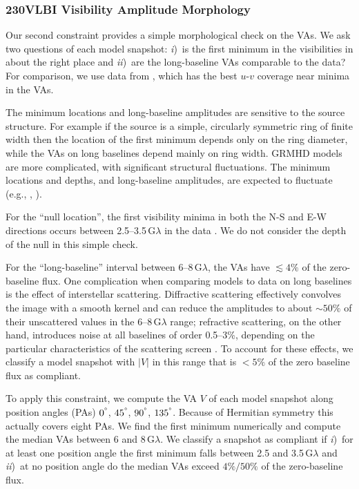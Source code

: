 \subsubsection{230\GHz VLBI Visibility Amplitude Morphology}

Our second constraint provides a simple morphological check on the
VAs.
We ask two questions of each model snapshot: \emph{i})~is the first
minimum in the visibilities in about the right place and
\emph{ii})~are the long-baseline VAs comparable to the data?
For comparison, we use data from \aprilvii, which has the best $u$-$v$
coverage near minima in the VAs.

The minimum locations and long-baseline amplitudes are sensitive to the
source structure.
For example if the source is a simple, circularly symmetric ring of
finite width then the location of the first minimum depends only on
the ring diameter, while the VAs on long baselines depend mainly on
ring width.
GRMHD models are more complicated, with significant structural
fluctuations.
The minimum locations and depths, and long-baseline amplitudes, are
expected to fluctuate (e.g., \citealt{2018ApJ...856..163M},
).

For the ``null location'', the first visibility minima in both the N-S
and E-W directions occurs between 2.5--3.5\,$\mathrm{G}\lambda$ in the
data .
We do not consider the depth of the null in this simple check.

For the ``long-baseline'' interval between 6--8\,$\mathrm{G}\lambda$,
the VAs have $\lesssim 4\%$ of the zero-baseline flux.
One complication when comparing models to data on long baselines is
the effect of interstellar scattering.
Diffractive scattering effectively convolves the image with a smooth
kernel and can reduce the amplitudes to about $\sim 50\%$ of their
unscattered values in the 6--8\,$\mathrm{G}\lambda$ range; refractive
scattering, on the other hand, introduces noise at all baselines of
order 0.5--3\%, depending on the particular characteristics of the
scattering screen \citep{2018arXiv180501242P, 2018ApJ...865..104J}.
To account for these effects, we classify a model snapshot with $|V|$
in this range that is $< 5\%$ of the zero baseline flux as compliant.

To apply this constraint, we compute the VA $V$ of each model snapshot
along position angles (PAs) $0^\degree$, $45^\degree$, $90^\degree$,
$135^\degree$.
Because of Hermitian symmetry this actually covers eight PAs.
We find the first minimum numerically and compute the median VAs
between 6 and 8\,$\mathrm{G}\lambda$.
We classify a snapshot as compliant if
\emph{i})~for at least one position angle the first minimum falls
between 2.5 and 3.5\,$\mathrm{G}\lambda$ and
\emph{ii})~at no position angle do the median VAs exceed $4\% /
50\%$ of the zero-baseline flux.

